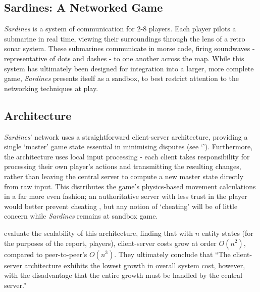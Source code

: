 \documentclass[a4paper, 10pt]{article}
\begin{document}
\graphicspath{{./Images/}}
\begin{flushleft}

\section*{Sardines: A Networked Game}

\textit{Sardines} is a system of communication for 2-8 players. Each player pilots a submarine in real time, viewing their surroundings through the lens of a retro sonar system. These submarines communicate in morse code, firing soundwaves - representative of dots and dashes - to one another across the map. While this system has ultimately been designed for integration into a larger, more complete game, \textit{Sardines} presents itself as a sandbox, to best restrict attention to the networking techniques at play.

\subsection*{Architecture}\label{Architecture}

\textit{Sardines}' network uses a straightforward client-server architecture, providing a single `master' game state essential in minimising disputes (see `'). Furthermore, the architecture uses local input processing - each client takes responsibility for processing their own player's actions and transmitting the resulting changes, rather than leaving the central server to compute a new master state directly from raw input. This distributes the game's physics-based movement calculations in a far more even fashion; an authoritative server with less trust in the player would better prevent cheating \citep{gmbta10}, but any notion of `cheating' will be of little concern while \textit{Sardines} remains at sandbox game.

\vspace{5pt}\noindent
\citeauthor{bauer04} \citeyearpar{bauer04} evaluate the scalability of this architecture, finding that with $n$ entity states (for the purposes of the report, players), client-server costs grow at order $O(n^2)$, compared to peer-to-peer's $O(n^3)$. They ultimately conclude that ``The client-server architecture exhibits the lowest growth in overall system cost, however, with the disadvantage that the entire growth must be handled by the central server.''  


\end{flushleft}
\end{document}
